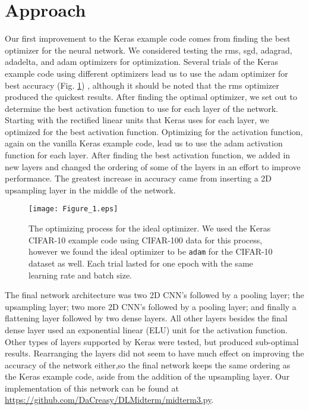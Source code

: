 \documentclass{article}
\begin{document}
\section{Approach}
Our first improvement to the Keras example code comes from finding the best optimizer for the neural network. We considered testing the rms, sgd, adagrad, adadelta, and adam optimizers for optimization. Several trials of the Keras example code using different optimizers lead us to use the adam optimizer for best accuracy (Fig. \ref{Fig: 1}) , although it should be noted that the rms optimizer produced the quickest results. After finding the optimal optimizer, we set out to determine the best activation function to use for each layer of the network. Starting with the rectified linear units that Keras uses for each layer, we optimized for the best activation function. Optimizing for the activation function, again on the vanilla Keras example code, lead us to use the adam activation function for each layer. After finding the best activation function, we added in new layers and changed the ordering of some of the layers in an effort to improve performance. The greatest increase in accuracy came from inserting a 2D upsampling layer in the middle of the network. \newline \indent

\begin{figure}[htpb!]
      \centering
      \texttt{[image: Figure\_1.eps]}
      \caption{The optimizing process for the ideal optimizer. We used the Keras CIFAR-10 example code using CIFAR-100 data for this process, however we found the ideal optimizer to be \texttt{adam} for the CIFAR-10 dataset as well. Each trial lasted for one epoch with the same learning rate and batch size.}\label{Fig: 1}
\end{figure}

The final network architecture was two 2D CNN’s followed by a pooling layer; the upsampling layer; two more 2D CNN’s followed by a pooling layer; and finally a flattening layer followed by two dense layers.
All other layers besides the final dense layer used an exponential linear (ELU) unit for the activation function. Other types of layers supported by Keras were tested, but produced sub-optimal results. Rearranging the layers did not seem to have much effect on improving the accuracy of the network either,so the final network keeps the same ordering as the Keras example code, aside from the addition of the upsampling layer. Our implementation of this network can be found at \url{https://github.com/DaCreasy/DLMidterm/midterm3.py}.
\end{document}
